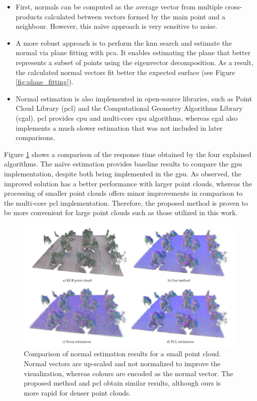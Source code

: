 \begin{itemize}
    \item First, normals can be computed as the average vector from multiple cross-products calculated between vectors formed by the main point and a neighbour. However, this naïve approach is very sensitive to noise.
    \item A more robust approach is to perform the \acrshort{knn} search and estimate the normal via plane fitting with \acrshort{pca}. It enables estimating the plane that better represents a subset of points \cite{sanchez_robust_2020} using the eigenvector decomposition. As a result, the calculated normal vectors fit better the expected surface (see Figure \ref{fig:plane_fitting}).
    \item Normal estimation is also implemented in open-source libraries, such as Point Cloud Library (\acrshort{pcl}) and the Computational Geometry Algorithms Library (\acrshort{cgal}). \acrshort{pcl} provides \acrshort{cpu} and multi-core \acrshort{cpu} algorithms, whereas \acrshort{cgal} also implements a much slower estimation that was not included in later comparisons.
\end{itemize}

Figure \ref{fig:thermal_normal_estimation} shows a comparison of the response time obtained by the four explained algorithms. The naïve estimation provides baseline results to compare the \acrshort{gpu} implementation, despite both being implemented in the \acrshort{gpu}. As observed, the improved solution has a better performance with larger point clouds, whereas the processing of smaller point clouds offers minor improvements in comparison to the multi-core \acrshort{pcl} implementation. Therefore, the proposed method is proven to be more convenient for large point clouds such as those utilized in this work.

\begin{figure} 
    \centering
    \includegraphics[width=\linewidth]{figs/thermal_projection/normal_estimation.png}
	\caption{Comparison of normal estimation results for a small point cloud. Normal vectors are up-scaled and not normalized to improve the visualization, whereas colours are encoded as the normal vector. The proposed method and \acrshort{pcl} obtain similar results, although ours is more rapid for denser point clouds.}
	\label{fig:thermal_normal_estimation}
\end{figure}

